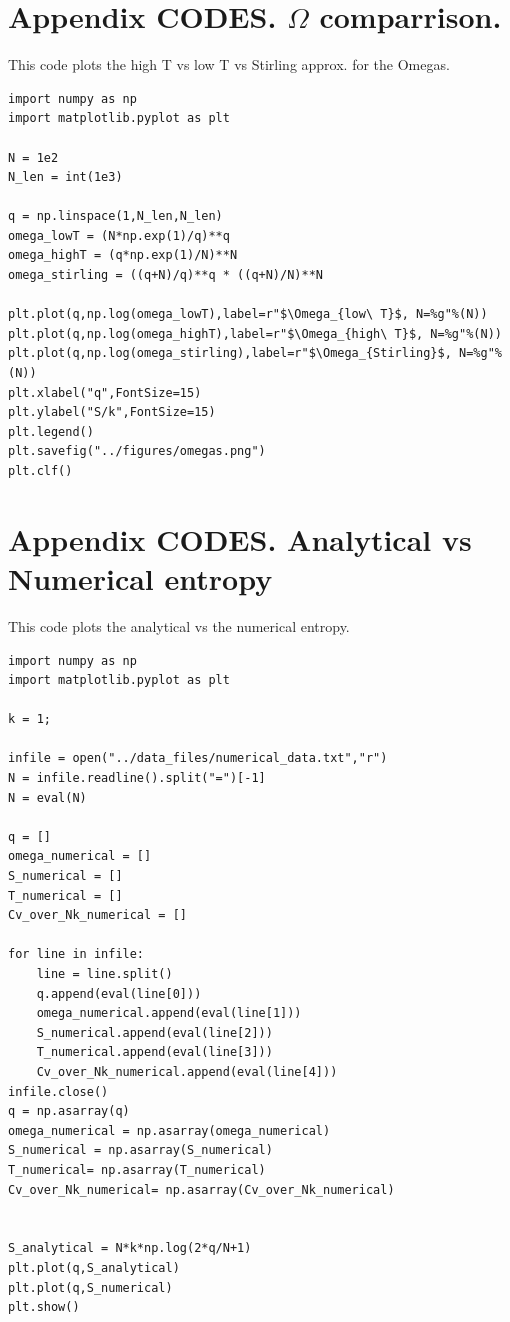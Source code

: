\documentclass[reprint,english,notitlepage]{revtex4-1}  %
\begin{document}
\section*{Appendix CODES. $\Omega$ comparrison.}
This code plots the high T vs low T vs Stirling approx. for the Omegas.
\begin{lstlisting}
import numpy as np
import matplotlib.pyplot as plt

N = 1e2
N_len = int(1e3)

q = np.linspace(1,N_len,N_len)
omega_lowT = (N*np.exp(1)/q)**q
omega_highT = (q*np.exp(1)/N)**N
omega_stirling = ((q+N)/q)**q * ((q+N)/N)**N

plt.plot(q,np.log(omega_lowT),label=r"$\Omega_{low\ T}$, N=%g"%(N))
plt.plot(q,np.log(omega_highT),label=r"$\Omega_{high\ T}$, N=%g"%(N))
plt.plot(q,np.log(omega_stirling),label=r"$\Omega_{Stirling}$, N=%g"%(N))
plt.xlabel("q",FontSize=15)
plt.ylabel("S/k",FontSize=15)
plt.legend()
plt.savefig("../figures/omegas.png")
plt.clf()
\end{lstlisting}
\section*{Appendix CODES. Analytical vs Numerical entropy}
This code plots the analytical vs the numerical entropy.
\begin{lstlisting}
import numpy as np
import matplotlib.pyplot as plt

k = 1;

infile = open("../data_files/numerical_data.txt","r")
N = infile.readline().split("=")[-1]
N = eval(N)

q = []
omega_numerical = []
S_numerical = []
T_numerical = []
Cv_over_Nk_numerical = []

for line in infile:
    line = line.split()
    q.append(eval(line[0]))
    omega_numerical.append(eval(line[1]))
    S_numerical.append(eval(line[2]))
    T_numerical.append(eval(line[3]))
    Cv_over_Nk_numerical.append(eval(line[4]))
infile.close()
q = np.asarray(q)
omega_numerical = np.asarray(omega_numerical)
S_numerical = np.asarray(S_numerical)
T_numerical= np.asarray(T_numerical)
Cv_over_Nk_numerical= np.asarray(Cv_over_Nk_numerical)


S_analytical = N*k*np.log(2*q/N+1)
plt.plot(q,S_analytical)
plt.plot(q,S_numerical)
plt.show()
\end{lstlisting}
\end{document}
